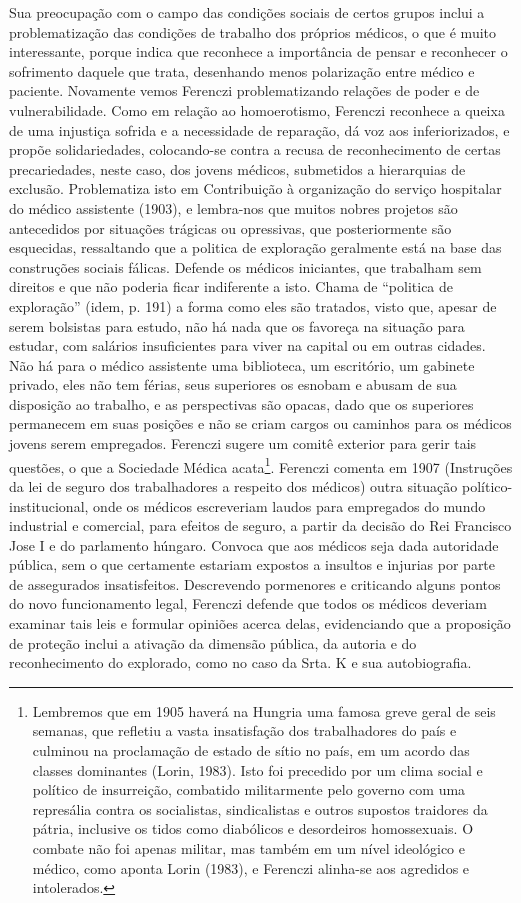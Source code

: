 Sua preocupação com o campo das condições sociais de certos grupos
inclui a problematização das condições de trabalho dos próprios médicos,
o que é muito interessante, porque indica que reconhece a importância de
pensar e reconhecer o sofrimento daquele que trata, desenhando menos
polarização entre médico e paciente. Novamente vemos Ferenczi
problematizando relações de poder e de vulnerabilidade. Como em relação
ao homoerotismo, Ferenczi reconhece a queixa de uma injustiça sofrida e
a necessidade de reparação, dá voz aos inferiorizados, e propõe
solidariedades, colocando-se contra a recusa de reconhecimento de certas
precariedades, neste caso, dos jovens médicos, submetidos a hierarquias
de exclusão. Problematiza isto em Contribuição à organização do serviço
hospitalar do médico assistente (1903), e lembra-nos que muitos nobres
projetos são antecedidos por situações trágicas ou opressivas, que
posteriormente são esquecidas, ressaltando que a politica de exploração
geralmente está na base das construções sociais fálicas. Defende os
médicos iniciantes, que trabalham sem direitos e que não poderia ficar
indiferente a isto. Chama de ``politica de exploração'' (idem, p. 191) a
forma como eles são tratados, visto que, apesar de serem bolsistas para
estudo, não há nada que os favoreça na situação para estudar, com
salários insuficientes para viver na capital ou em outras cidades. Não
há para o médico assistente uma biblioteca, um escritório, um gabinete
privado, eles não tem férias, seus superiores os esnobam e abusam de sua
disposição ao trabalho, e as perspectivas são opacas, dado que os
superiores permanecem em suas posições e não se criam cargos ou caminhos
para os médicos jovens serem empregados. Ferenczi sugere um comitê
exterior para gerir tais questões, o que a Sociedade Médica
acata\footnote{Lembremos que em 1905 haverá na Hungria uma famosa greve
  geral de seis semanas, que refletiu a vasta insatisfação dos
  trabalhadores do país e culminou na proclamação de estado de sítio no
  país, em um acordo das classes dominantes (Lorin, 1983). Isto foi
  precedido por um clima social e político de insurreição, combatido
  militarmente pelo governo com uma represália contra os socialistas,
  sindicalistas e outros supostos traidores da pátria, inclusive os
  tidos como diabólicos e desordeiros homossexuais. O combate não foi
  apenas militar, mas também em um nível ideológico e médico, como
  aponta Lorin (1983), e Ferenczi alinha-se aos agredidos e intolerados.}.
Ferenczi comenta em 1907 (Instruções da lei de seguro dos trabalhadores
a respeito dos médicos) outra situação político-institucional, onde os
médicos escreveriam laudos para empregados do mundo industrial e
comercial, para efeitos de seguro, a partir da decisão do Rei Francisco
Jose I e do parlamento húngaro. Convoca que aos médicos seja dada
autoridade pública, sem o que certamente estariam expostos a insultos e
injurias por parte de assegurados insatisfeitos. Descrevendo pormenores
e criticando alguns pontos do novo funcionamento legal, Ferenczi defende
que todos os médicos deveriam examinar tais leis e formular opiniões
acerca delas, evidenciando que a proposição de proteção inclui a
ativação da dimensão pública, da autoria e do reconhecimento do
explorado, como no caso da Srta. K e sua autobiografia.

